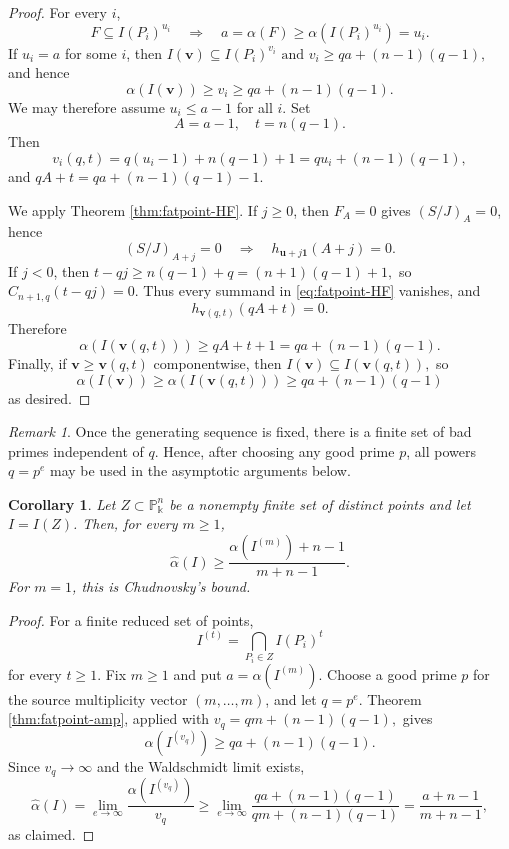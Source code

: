 \documentclass[11pt]{amsart}
\newtheorem{corollary}[theorem]{Corollary}
\theoremstyle{remark}
\newtheorem{remark}[theorem]{Remark}
\newcommand{\PP}{\mathbb P}
\newcommand{\kk}{\Bbbk}
\begin{document}
\begin{proof}
For every $i$,
$$
F\subseteq I(P_i)^{u_i}
\quad\Longrightarrow\quad
a=\alpha(F)\ge\alpha(I(P_i)^{u_i})=u_i.
$$
If $u_i=a$ for some $i$, then
$
I(\mathbf v)\subseteq I(P_i)^{v_i} \text{ and }
v_i\ge qa+(n-1)(q-1),
$
and hence
$$
\alpha(I(\mathbf v))
\ge v_i
\ge qa+(n-1)(q-1).
$$
We may therefore assume $u_i\le a-1$ for all $i$. Set
$$
A=a-1,
\quad
t=n(q-1).
$$
Then
$$
v_i(q,t)
=q(u_i-1)+n(q-1)+1
=qu_i+(n-1)(q-1),
$$
and
$
qA+t
=qa+(n-1)(q-1)-1.
$

We apply Theorem \ref{thm:fatpoint-HF}. If $j\ge0$, then $F_A=0$ gives $(S/J)_A=0$, hence
$$
(S/J)_{A+j}=0
\quad\Longrightarrow\quad
h_{\mathbf u+j\mathbf1}(A+j)=0.
$$
If $j<0$, then
$
t-qj \ge n(q-1)+q = (n+1)(q-1)+1,
$
so
$
C_{n+1,q}(t-qj)=0.
$
Thus every summand in \eqref{eq:fatpoint-HF} vanishes, and
$$
h_{\mathbf v(q,t)}(qA+t)=0.
$$
Therefore
$$
\alpha(I(\mathbf v(q,t)))
\ge qA+t+1
=qa+(n-1)(q-1).
$$
Finally, if $\mathbf v\ge\mathbf v(q,t)$ componentwise, then
$
I(\mathbf v)\subseteq I(\mathbf v(q,t)),
$
so
$$
\alpha(I(\mathbf v))
\ge
\alpha(I(\mathbf v(q,t)))
\ge qa+(n-1)(q-1)
$$
as desired.
\end{proof}

\begin{remark}\label{rem:prime-order}
Once the generating sequence is fixed, there is a finite set of bad primes independent of $q$. Hence, after choosing any good prime $p$, all powers $q=p^e$ may be used in the asymptotic arguments below.
\end{remark}


\begin{corollary}\label{cor:points}
Let $Z\subset\PP_\kk^n$ be a nonempty finite set of distinct points and let $I=I(Z)$. Then, for every $m\ge1$,
$$
\widehat\alpha(I)
\ge
\frac{\alpha(I^{(m)})+n-1}{m+n-1}.
$$
For $m=1$, this is Chudnovsky's bound.
\end{corollary}

\begin{proof}
For a finite reduced set of points,
$$
I^{(t)}=\bigcap_{P_i\in Z}I(P_i)^t
$$
for every $t\ge1$. Fix $m\ge1$ and put $a=\alpha(I^{(m)})$. Choose a good prime $p$ for the source multiplicity vector $(m,\ldots,m)$, and let $q=p^e$. Theorem \ref{thm:fatpoint-amp}, applied with
$
v_q=qm+(n-1)(q-1),
$
gives
$$
\alpha(I^{(v_q)})
\ge
qa+(n-1)(q-1).
$$
Since $v_q\to\infty$ and the Waldschmidt limit exists,
$$
\widehat\alpha(I)
=
\lim_{e\to\infty}\frac{\alpha(I^{(v_q)})}{v_q}
\ge
\lim_{e\to\infty}
\frac{qa+(n-1)(q-1)}{qm+(n-1)(q-1)}
=
\frac{a+n-1}{m+n-1},
$$
as claimed.
\end{proof}
\end{document}
